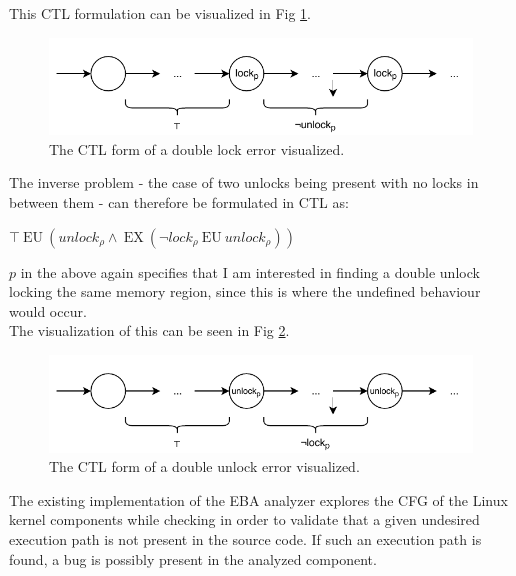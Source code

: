 \noindent This CTL formulation can be visualized in Fig \ref{fig:doublelock}.

\begin{figure}[h]
    \centering
    \includegraphics{background/figures/doublelock}
    \caption{The CTL form of a double lock error visualized.}
    \label{fig:doublelock}
\end{figure}

\noindent The inverse problem - the case of two unlocks being present with no locks in between them - can therefore be formulated in CTL as: 

\begin{center}
    $\top\:\mathrm{EU}\:\left({u n l o c k}_{\rho} \wedge\:\mathrm{EX}\:\left(\neg {l o c k}_{\rho}\:\mathrm{EU}\:{u n l o c k}_{\rho}\right)\right)$
\end{center}

\noindent $p$ in the above again specifies that I am interested in finding a double unlock locking the same memory region, since this is where the undefined behaviour would occur. \\

\noindent The visualization of this can be seen in Fig \ref{fig:doubleunlock}. \\

\begin{figure}[h]
    \centering
    \includegraphics{background/figures/doubleunlock}
    \caption{The CTL form of a double unlock error visualized.}
    \label{fig:doubleunlock}
\end{figure}

\noindent The existing implementation of the EBA analyzer explores the CFG of the Linux kernel components while checking in order to validate that a given undesired execution path is not present in the source code. If such an execution path is found, a bug is possibly present in the analyzed component. \\

